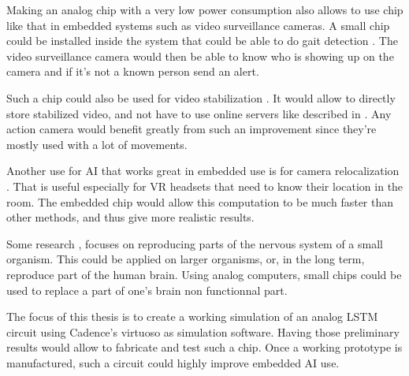Making an analog chip with a very low power consumption also allows to use chip like that in embedded systems such as video surveillance cameras. A small chip could be installed inside the system that could be able to do gait detection \cite{gaitDS,gaitDig,gait}. The video surveillance camera would then be able to know who is showing up on the camera and if it's not a known person send an alert.

Such a chip could also be used for video stabilization \cite{videoStab}. It would allow to directly store stabilized video, and not have to use online servers like described in \cite{videoStab}. Any action camera would benefit greatly from such an improvement since they're mostly used with a lot of movements.

Another use for \ac{AI} that works great in embedded use is for camera relocalization \cite{videoReloc}. That is useful especially for VR headsets that need to know their location in the room. The embedded chip would allow this computation to be much faster than other methods, and thus give more realistic results.

Some research \cite{celegans}, focuses on reproducing parts of the nervous system of a small organism. This could be applied on larger organisms, or, in the long term, reproduce part of the human brain. Using analog computers, small chips could be used to replace a part of one's brain non functionnal part.

The focus of this thesis is to create a working simulation of an analog \ac{LSTM} circuit using Cadence's virtuoso as simulation software. Having those preliminary results would allow to fabricate and test such a chip. Once a working prototype is manufactured, such a circuit could highly improve embedded \ac{AI} use.
